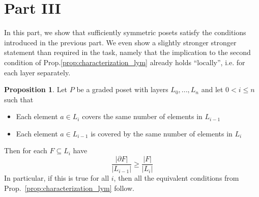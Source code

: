\documentclass{scrartcl}
\theoremstyle{definition}
\newtheorem{proposition}[definition]{Proposition}
\begin{document}
\section{Part III}
In this part, we show that sufficiently symmetric posets satisfy the conditions introduced in the previous part.
We even show a slightly stronger stronger statement than required in the task, namely that the implication to the second condition of Prop.\ref{prop:characterization_lym} already holds ``locally'', i.e. for each layer separately.
\begin{proposition}
    \label{prop:biregular_implies_lym}
    Let $P$ be a graded poset with layers $L_0, ..., L_n$ and let $0 < i \leq n$ such that
    \begin{itemize}
        \item Each element $a \in L_i$ covers the same number of elements in $L_{i - 1}$
        \item Each element $a \in L_{i - 1}$ is covered by the same number of elements in $L_i$
    \end{itemize}
    Then for each $F \subseteq L_i$ have
    \begin{equation*}
        \frac {|\partial F|} {|L_{i - 1}|} \geq \frac {|F|} {|L_i|}
    \end{equation*}
    In particular, if this is true for all $i$, then all the equivalent conditions from Prop.~\ref{prop:characterization_lym} follow.
\end{proposition}
\end{document}
